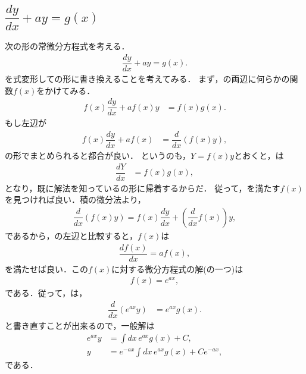\subsection{$\dfrac{dy}{dx} + a y = g(x)$\label{sec:PDE_03}}
%
次の形の常微分方程式を考える．
\begin{align}
 \dfrac{dy}{dx} + a y = g(x). \label{eq:PDE_03}
\end{align}
を式変形しての形に書き換えることを考えてみる．
まず，の両辺に何らかの関数$f\left(x\right)$をかけてみる．
\begin{align}
 f\left(x\right)\dfrac{dy}{dx}+af\left(x\right)y&=f\left(x\right)g\left(x\right). \label{eq:PDE_03_01}
\end{align}
もし左辺が
\begin{align}
 f\left(x\right)\dfrac{dy}{dx}+af\left(x\right) & =\dfrac{d}{dx}\left(f\left(x\right)y\right), \label{eq:PDE_03_lhs}
\end{align}
の形でまとめられると都合が良い．
というのも，$Y=f\left(x\right)y$とおくと，は
\begin{align}
 \dfrac{dY}{dx} & =f\left(x\right)g\left(x\right), 
\end{align}
となり，既に解法を知っているの形に帰着するからだ．
従って，を満たす$f\left(x\right)$を見つければ良い．積の微分法より，
\begin{align}
 \dfrac{d}{dx}\left(f\left(x\right)y\right)=f\left(x\right)\dfrac{dy}{dx}+\left(\dfrac{d}{dx}f\left(x\right)\right)y, 
\end{align}
であるから，の左辺と比較すると，$f\left(x\right)$は
\begin{align}
 \dfrac{df\left(x\right)}{dx} = af\left(x\right),
\end{align}
を満たせば良い．この$f\left(x\right)$に対する微分方程式の解(の一つ)は
\begin{align}
  f\left(x\right) = e^{ax},
\end{align}
である．従って，は，
\begin{align}
  \dfrac{d}{dx}\left(e^{ax}y\right) & =e^{ax}g\left(x\right).
\end{align}
と書き直すことが出来るので，一般解は
\begin{align}
  e^{ax}y & =\int dx\,e^{ax}g\left(x\right)+C, \\
  y & =e^{-ax}\int dx\,e^{ax}g\left(x\right)+Ce^{-ax},
\end{align}
である．
%
